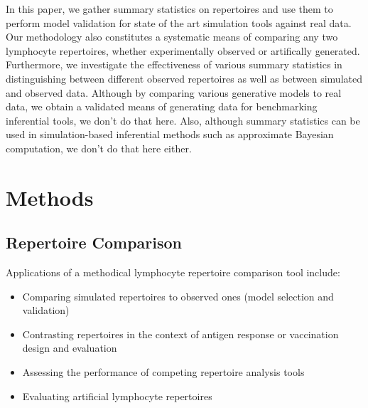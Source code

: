 \documentclass{article}
\begin{document}
In this paper, we gather summary statistics on repertoires and use them to perform model validation for state of the art simulation tools against real data.
Our methodology also constitutes a systematic means of comparing any two lymphocyte repertoires, whether experimentally observed or artifically generated.
Furthermore, we investigate the effectiveness of various summary statistics in distinguishing between different observed repertoires as well as between simulated and observed data.
Although by comparing various generative models to real data, we obtain a validated means of generating data for benchmarking inferential tools, we don't do that here.
Also, although summary statistics can be used in simulation-based inferential methods such as approximate Bayesian computation, we don't do that here either.

\section*{Methods}

\subsection*{Repertoire Comparison}

Applications of a methodical lymphocyte repertoire comparison tool include:
\begin{itemize}
\item Comparing simulated repertoires to observed ones (model selection and validation)
\item Contrasting repertoires in the context of antigen response or vaccination design and evaluation
\item Assessing the performance of competing repertoire analysis tools
\item Evaluating artificial lymphocyte repertoires \cite{Finlay2012}
\end{itemize}
\end{document}

